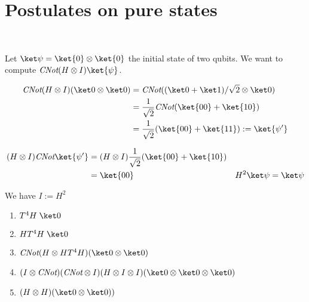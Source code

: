 \section{Postulates on pure states}

\exo[Evolutions]~

Let $\ket \psi = \ket{0} \otimes \ket{0}$ the initial state of two
qubits. We want to compute $\textit{CNot} (H \otimes I) \ket{\psi}$.

\begin{align*}
  \CNot (H \otimes I) (\ket 0 \otimes \ket 0) &=
    \CNot ((\ket 0 + \ket 1)/\sqrt 2 \otimes \ket 0) \\
    &= \frac 1 {\sqrt 2} \CNot (\ket{00} + \ket{10}) \\
    &= \frac 1 {\sqrt 2} (\ket{00} + \ket{11}) := \ket{\psi'}
\end{align*}

\begin{align*}
  (H\otimes I)\CNot \ket{\psi'}
  &= (H\otimes I) \frac 1 {\sqrt 2} (\ket{00} + \ket{10}) \\
  &= \ket {00} & H^2\ket \psi = \ket \psi
\end{align*}

We have $I := H^2$

\begin{enumerate}
  \item $T^4H\; \ket 0$
  \item $HT^4H\; \ket 0$
  \item $\CNot(H \otimes HT^4H)(\ket 0 \otimes \ket 0)$
  \item $(I \otimes \CNot)(\CNot \otimes I)(H \otimes I \otimes I)
    (\ket 0 \otimes \ket 0 \otimes \ket 0)$
  \item $(H \otimes H) (\ket 0 \otimes \ket 0))$
\end{enumerate}

~


